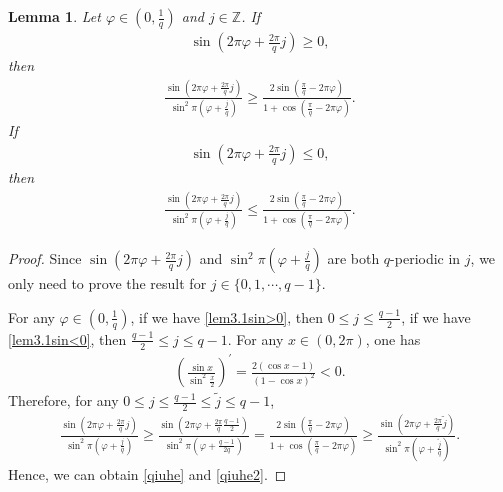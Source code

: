 \documentclass[12pt]{amsart}
\theoremstyle{plain}
\newtheorem{lemma}[theorem]{Lemma}
\theoremstyle{definition}
\begin{document}
	\begin{lemma}
		Let $\varphi\in\left(0,\frac{1}{q}\right)$ and $j\in\mathbb{Z}$. If
		\begin{align}
			\sin\left(2\pi\varphi+\frac{2\pi}{q}j\right)\geq 0,\label{lem3.1sin>0}
		\end{align}
then
			\begin{align}\label{qiuhe}
				\frac{\sin\left(2\pi\varphi+\frac{2\pi}{q}j\right)}{\sin^2\pi\left(\varphi+\frac{j}{q}\right)}\geq \frac{2\sin\left(\frac{\pi}{q}-2\pi\varphi\right)}{1+\cos\left(\frac{\pi}{q}-2\pi\varphi\right)}.
			\end{align}
			If 
			\begin{align}
				\sin\left(2\pi\varphi+\frac{2\pi}{q}j\right)\leq 0,\label{lem3.1sin<0}
			\end{align}
		then
			\begin{align}\label{qiuhe2}
				\frac{\sin\left(2\pi\varphi+\frac{2\pi}{q}j\right)}{\sin^2\pi\left(\varphi+\frac{j}{q}\right)}\leq \frac{2\sin\left(\frac{\pi}{q}-2\pi\varphi\right)}{1+\cos\left(\frac{\pi}{q}-2\pi\varphi\right)}.
			\end{align}
	\end{lemma}
\begin{proof} Since $\sin\left(2\pi\varphi+\frac{2\pi}{q}j\right)$ and $\sin^2\pi\left(\varphi+\frac{j}{q}\right)$ are both $q$-periodic in $j$, we only need to prove the result for $j\in \{0,1,\cdots,q-1\}$. 
	
	For any $\varphi\in \left(0,\frac{1}{q}\right)$, if we have \eqref{lem3.1sin>0},
	then  $0\leq j\leq \frac{q-1}{2}$, if we have \eqref{lem3.1sin<0},
	then $\frac{q-1}{2}\leq j \leq q-1.$
	For any $x\in (0,2\pi)$, one has
	\begin{align}
		\left(\frac{\sin x}{\sin^2\frac{x}{2}}\right)^{\prime}=\frac{2(\cos x-1)}{(1-\cos x)^2}<0.\nonumber
	\end{align}
Therefore, for any $0\leq j\leq \frac{q-1}{2}\leq \tilde{j}\leq q-1$,
\begin{align}
	\frac{\sin\left(2\pi\varphi+\frac{2\pi}{q}j\right)}{\sin^2\pi\left(\varphi+\frac{j}{q}\right)}\geq \frac{\sin\left(
		2\pi\varphi+\frac{2\pi}{q}\frac{q-1}{2}\right)}{\sin^2\pi\left(\varphi+\frac{q-1}{2q}\right)}=\frac{2\sin\left(\frac{\pi}{q}-2\pi\varphi\right)}{1+\cos \left(\frac{\pi}{q}-2\pi\varphi\right)}\geq \frac{\sin\left(2\pi\varphi+\frac{2\pi}{q}\tilde{j}\right)}{\sin^2\pi\left(\varphi+\frac{\tilde{j}}{q}\right)}.\nonumber
\end{align}
	Hence, we can obtain \eqref{qiuhe} and \eqref{qiuhe2}. 
\end{proof}
\end{document}
